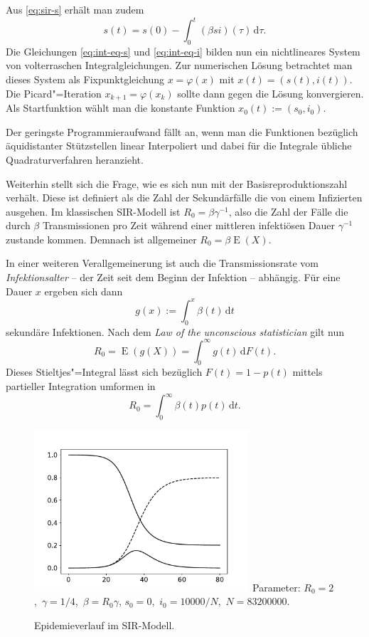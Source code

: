 \documentclass[a4paper,10pt,fleqn,twocolumn,twoside,dvipdfmx]{scrartcl}
\numberwithin{equation}{section}
\begin{document}
Aus \eqref{eq:sir-s} erhält man zudem
\begin{equation}\label{eq:int-eq-s}
s(t) = s(0) - \int_0^t (\beta si)(\tau)\,\mathrm d\tau.
\end{equation}
Die Gleichungen \eqref{eq:int-eq-s} und \eqref{eq:int-eq-i}
bilden nun ein nichtlineares System von volterraschen
Integralgleichungen. Zur numerischen
Lösung betrachtet man dieses System als Fixpunktgleichung
$x=\varphi(x)$ mit $x(t)=(s(t),i(t))$. Die Picard"=Iteration
$x_{k+1} = \varphi(x_k)$ sollte dann gegen die Lösung konvergieren.
Als Startfunktion wählt man die konstante Funktion
$x_0(t) := (s_0,i_0)$.

Der geringste Programmieraufwand fällt an, wenn man die Funktionen
bezüglich äquidistanter Stützstellen linear Interpoliert und dabei
für die Integrale übliche Quadraturverfahren heranzieht.

Weiterhin stellt sich die Frage, wie es sich nun mit der
Basisreproduktionszahl verhält. Diese ist definiert als die Zahl der
Sekundärfälle die von einem Infizierten ausgehen. Im klassischen
SIR-Modell ist $R_0 = \beta\gamma^{-1}$, also die Zahl der Fälle die
durch $\beta$ Transmissionen pro Zeit während einer mittleren
infektiösen Dauer $\gamma^{-1}$ zustande kommen. Demnach ist
allgemeiner $R_0 = \beta\operatorname{E}(X)$.

In einer weiteren Verallgemeinerung ist auch die Transmissionsrate
vom \emph{Infektionsalter} -- der Zeit seit dem Beginn der
Infektion -- abhängig. Für eine Dauer $x$ ergeben sich dann%
\begin{equation}
g(x) := \int_0^x \beta(t)\,\mathrm dt
\end{equation}
sekundäre Infektionen. Nach dem
\emph{Law of the unconscious statistician}
gilt nun%
\begin{equation}
R_0 = \operatorname{E}(g(X)) = \int_0^\infty g(t)\,\mathrm dF(t).
\end{equation}
Dieses Stieltjes"=Integral lässt sich bezüglich $F(t)=1-p(t)$
mittels partieller Integration umformen in%
\begin{equation}
R_0 = \int_0^\infty \beta(t)p(t)\,\mathrm dt.
\end{equation}

\begin{figure}
\begin{center}
\includegraphics[width=80mm]{img/01-sir.pdf}
Parameter: $R_0 = 2$,\, $\gamma = 1/4$,\, $\beta = R_0\gamma$,\newline
$s_0 = 0$,\, $i_0 = 10000/N$,\, $N = 83200000$.
\end{center}
\caption{Epidemieverlauf im SIR-Modell.}
\end{figure}
\end{document}
